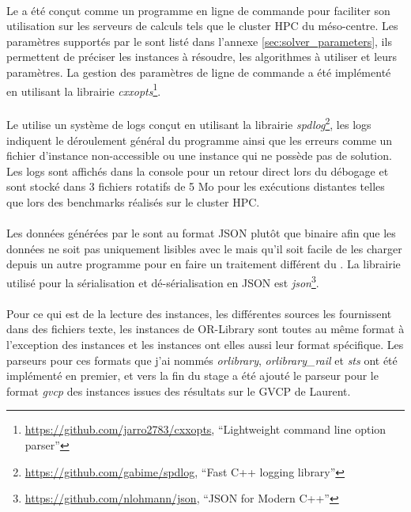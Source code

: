 \documentclass[a4paper,11pt,twoside,french,report]{../common/simplem}
\begin{document}
				\paragraph*{}
					Le \solver{} a été conçut comme un programme en ligne de commande pour faciliter son utilisation sur les serveurs de calculs tels que le cluster \gls{HPC} du méso-centre. Les paramètres supportés par le \solver{} sont listé dans l'annexe \ref{sec:solver_parameters}, ils permettent de préciser les instances à résoudre, les algorithmes à utiliser et leurs paramètres. La gestion des paramètres de ligne de commande a été implémenté en utilisant la librairie \textit{cxxopts}\footnote{\url{https://github.com/jarro2783/cxxopts}, ``Lightweight \Cpp{} command line option parser''}.
				\paragraph*{}
					Le \solver{} utilise un système de logs conçut en utilisant la librairie \textit{spdlog}\footnote{\url{https://github.com/gabime/spdlog}, ``Fast C++ logging library''}, les logs indiquent le déroulement général du programme ainsi que les erreurs comme un fichier d'instance non-accessible ou une instance qui ne possède pas de solution. Les logs sont affichés dans la console pour un retour direct lors du débogage et sont stocké dans 3 fichiers rotatifs de 5 Mo pour les exécutions distantes telles que lors des benchmarks réalisés sur le cluster \gls{HPC}.
				\paragraph*{}
					Les données générées par le \solver{} sont au format JSON plutôt que binaire afin que les données ne soit pas uniquement lisibles avec le \printer{} mais qu'il soit facile de les charger depuis un autre programme pour en faire un traitement différent du \printer{}. La librairie utilisé pour la sérialisation et dé-sérialisation en JSON est \textit{json}\footnote{\url{https://github.com/nlohmann/json}, ``JSON for Modern C++''}.
				\paragraph*{}
					Pour ce qui est de la lecture des instances, les différentes sources les fournissent dans des fichiers texte, les instances de OR-Library sont toutes au même format à l'exception des instances  et les instances  ont elles aussi leur format spécifique. Les parseurs pour ces formats que j'ai nommés \textit{orlibrary}, \textit{orlibrary\_rail} et \textit{sts} ont été implémenté en premier, et vers la fin du stage a été ajouté le parseur pour le format \textit{gvcp} des instances issues des résultats sur le \gls{GVCP} de Laurent.
\end{document}
